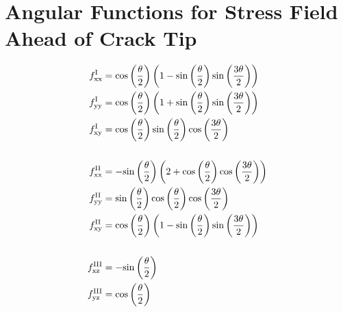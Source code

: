 \documentclass[format=acmtog, 12pt, screen=true, review=false]{acmart}
\begin{document}
\section{Angular Functions for Stress Field Ahead of Crack Tip}

\begin{align*}
    f_{\rm{xx}}^{\rm{I}}&=\rm{cos}\left(\frac{\theta}{2}\right)\left(1-\rm{sin}\left(\frac{\theta}{2}\right)\rm{sin}\left(\frac{3\theta}{2}\right)\right)\\
    f_{\rm{yy}}^{\rm{I}}&=\rm{cos}\left(\frac{\theta}{2}\right)\left(1+\rm{sin}\left(\frac{\theta}{2}\right)\rm{sin}\left(\frac{3\theta}{2}\right)\right)\\
    f_{\rm{xy}}^{\rm{I}}&=\rm{cos}\left(\frac{\theta}{2}\right)\rm{sin}\left(\frac{\theta}{2}\right)\rm{cos}\left(\frac{3\theta}{2}\right)\\
    \\
    f_{\rm{xx}}^{\rm{II}}&=-\rm{sin}\left(\frac{\theta}{2}\right)\left(2+\rm{cos}\left(\frac{\theta}{2}\right)\rm{cos}\left(\frac{3\theta}{2}\right)\right)\\
    f_{\rm{yy}}^{\rm{II}}&=\rm{sin}\left(\frac{\theta}{2}\right)\rm{cos}\left(\frac{\theta}{2}\right)\rm{cos}\left(\frac{3\theta}{2}\right)\\
    f_{\rm{xy}}^{\rm{II}}&=\rm{cos}\left(\frac{\theta}{2}\right)\left(1-\rm{sin}\left(\frac{\theta}{2}\right)\rm{sin}\left(\frac{3\theta}{2}\right)\right)\\
    \\
    f_{\rm{xz}}^{\rm{III}}&=-\rm{sin}\left(\frac{\theta}{2}\right)\\
    f_{\rm{yz}}^{\rm{III}}&=\rm{cos}\left(\frac{\theta}{2}\right)\\
\end{align*}
\end{document}
